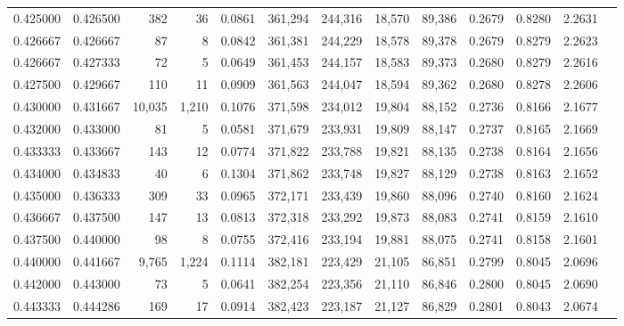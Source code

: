 \begin{tabular}{rrrrrrrrrrrrr}
0.425000 & 0.426500 &    382 &    36 &                                     0.0861 & 361,294 & 244,316 &  18,570 &  89,386 & 0.2679 & 0.8280 & 2.2631 \\
0.426667 & 0.426667 &     87 &     8 &                                     0.0842 & 361,381 & 244,229 &  18,578 &  89,378 & 0.2679 & 0.8279 & 2.2623 \\
0.426667 & 0.427333 &     72 &     5 &                                     0.0649 & 361,453 & 244,157 &  18,583 &  89,373 & 0.2680 & 0.8279 & 2.2616 \\
0.427500 & 0.429667 &    110 &    11 &                                     0.0909 & 361,563 & 244,047 &  18,594 &  89,362 & 0.2680 & 0.8278 & 2.2606 \\
0.430000 & 0.431667 & 10,035 & 1,210 &                                     0.1076 & 371,598 & 234,012 &  19,804 &  88,152 & 0.2736 & 0.8166 & 2.1677 \\
0.432000 & 0.433000 &     81 &     5 &                                     0.0581 & 371,679 & 233,931 &  19,809 &  88,147 & 0.2737 & 0.8165 & 2.1669 \\
0.433333 & 0.433667 &    143 &    12 &                                     0.0774 & 371,822 & 233,788 &  19,821 &  88,135 & 0.2738 & 0.8164 & 2.1656 \\
0.434000 & 0.434833 &     40 &     6 &                                     0.1304 & 371,862 & 233,748 &  19,827 &  88,129 & 0.2738 & 0.8163 & 2.1652 \\
0.435000 & 0.436333 &    309 &    33 &                                     0.0965 & 372,171 & 233,439 &  19,860 &  88,096 & 0.2740 & 0.8160 & 2.1624 \\
0.436667 & 0.437500 &    147 &    13 &                                     0.0813 & 372,318 & 233,292 &  19,873 &  88,083 & 0.2741 & 0.8159 & 2.1610 \\
0.437500 & 0.440000 &     98 &     8 &                                     0.0755 & 372,416 & 233,194 &  19,881 &  88,075 & 0.2741 & 0.8158 & 2.1601 \\
0.440000 & 0.441667 &  9,765 & 1,224 &                                     0.1114 & 382,181 & 223,429 &  21,105 &  86,851 & 0.2799 & 0.8045 & 2.0696 \\
0.442000 & 0.443000 &     73 &     5 &                                     0.0641 & 382,254 & 223,356 &  21,110 &  86,846 & 0.2800 & 0.8045 & 2.0690 \\
0.443333 & 0.444286 &    169 &    17 &                                     0.0914 & 382,423 & 223,187 &  21,127 &  86,829 & 0.2801 & 0.8043 & 2.0674 \\

\end{tabular}
